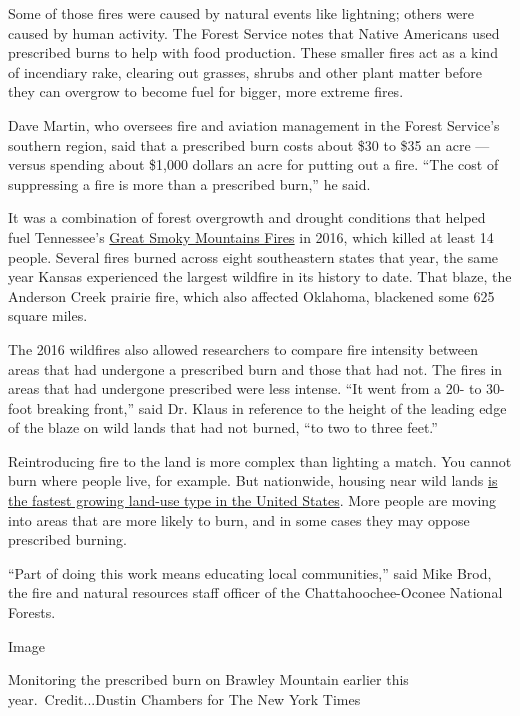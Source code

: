 Some of those fires were caused by natural events like lightning; others
were caused by human activity. The Forest Service notes that Native
Americans used prescribed burns to help with food production. These
smaller fires act as a kind of incendiary rake, clearing out grasses,
shrubs and other plant matter before they can overgrow to become fuel
for bigger, more extreme fires.

Dave Martin, who oversees fire and aviation management in the Forest
Service's southern region, said that a prescribed burn costs about \$30
to \$35 an acre --- versus spending about \$1,000 dollars an acre for
putting out a fire. ``The cost of suppressing a fire is more than a
prescribed burn,'' he said.

It was a combination of forest overgrowth and drought conditions that
helped fuel Tennessee's
\href{https://www.nytimes3xbfgragh.onion/2016/11/29/us/gatlinburg-tennessee-wildfire.html?searchResultPosition=4}{Great
Smoky Mountains Fires} in 2016, which killed at least 14 people. Several
fires burned across eight southeastern states that year, the same year
Kansas experienced the largest wildfire in its history to date. That
blaze, the Anderson Creek prairie fire, which also affected Oklahoma,
blackened some 625 square miles.

The 2016 wildfires also allowed researchers to compare fire intensity
between areas that had undergone a prescribed burn and those that had
not. The fires in areas that had undergone prescribed were less intense.
``It went from a 20- to 30-foot breaking front,'' said Dr. Klaus in
reference to the height of the leading edge of the blaze on wild lands
that had not burned, ``to two to three feet.''

Reintroducing fire to the land is more complex than lighting a match.
You cannot burn where people live, for example. But nationwide, housing
near wild lands
\href{https://www.nytimes3xbfgragh.onion/2018/11/15/climate/california-fires-wildland-urban-interface.html}{is
the fastest growing land-use type in the United States}. More people are
moving into areas that are more likely to burn, and in some cases they
may oppose prescribed burning.

``Part of doing this work means educating local communities,'' said Mike
Brod, the fire and natural resources staff officer of the
Chattahoochee-Oconee National Forests.

Image

Monitoring the prescribed burn on Brawley Mountain earlier this
year.~Credit...Dustin Chambers for The New York Times

